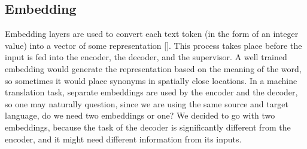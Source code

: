 \documentclass[letterpaper]{article} %
\begin{document}
\subsection{Embedding}
Embedding layers are used to convert each text token (in the form of an integer value) into a vector of some representation []. This process takes place before the input is fed into the encoder, the decoder, and the supervisor. A well trained embedding would generate the representation based on the meaning of the word, so sometimes it would place synonyms in spatially close locations. In a machine translation task, separate embeddings are used by the encoder and the decoder, so one may naturally question, since we are using the same source and target language, do we need two embeddings or one? We decided to go with two embeddings, because the task of the decoder is significantly different from the encoder, and it might need different information from its inputs.\cite{bahdanau2014neural}



\end{document}
